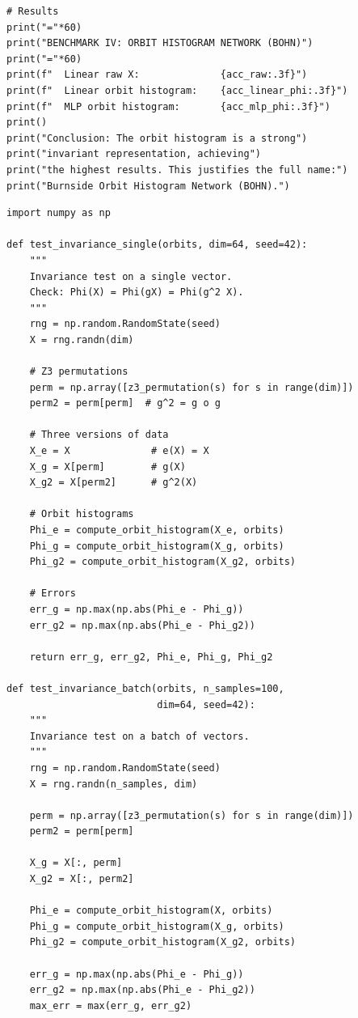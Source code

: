 \documentclass[11pt,a4paper]{report}
\begin{document}
\begin{lstlisting}[caption={Benchmark IV --- Orbit Histogram Network (BOHN)}]
# Results
print("="*60)
print("BENCHMARK IV: ORBIT HISTOGRAM NETWORK (BOHN)")
print("="*60)
print(f"  Linear raw X:              {acc_raw:.3f}")
print(f"  Linear orbit histogram:    {acc_linear_phi:.3f}")
print(f"  MLP orbit histogram:       {acc_mlp_phi:.3f}")
print()
print("Conclusion: The orbit histogram is a strong")
print("invariant representation, achieving")
print("the highest results. This justifies the full name:")
print("Burnside Orbit Histogram Network (BOHN).")
\end{lstlisting}

\label{app:ch2-lst9}
\begin{lstlisting}[caption={Orbit histogram invariance test}]
import numpy as np

def test_invariance_single(orbits, dim=64, seed=42):
    """
    Invariance test on a single vector.
    Check: Phi(X) = Phi(gX) = Phi(g^2 X).
    """
    rng = np.random.RandomState(seed)
    X = rng.randn(dim)
    
    # Z3 permutations
    perm = np.array([z3_permutation(s) for s in range(dim)])
    perm2 = perm[perm]  # g^2 = g o g
    
    # Three versions of data
    X_e = X              # e(X) = X
    X_g = X[perm]        # g(X)
    X_g2 = X[perm2]      # g^2(X)
    
    # Orbit histograms
    Phi_e = compute_orbit_histogram(X_e, orbits)
    Phi_g = compute_orbit_histogram(X_g, orbits)
    Phi_g2 = compute_orbit_histogram(X_g2, orbits)
    
    # Errors
    err_g = np.max(np.abs(Phi_e - Phi_g))
    err_g2 = np.max(np.abs(Phi_e - Phi_g2))
    
    return err_g, err_g2, Phi_e, Phi_g, Phi_g2

def test_invariance_batch(orbits, n_samples=100, 
                          dim=64, seed=42):
    """
    Invariance test on a batch of vectors.
    """
    rng = np.random.RandomState(seed)
    X = rng.randn(n_samples, dim)
    
    perm = np.array([z3_permutation(s) for s in range(dim)])
    perm2 = perm[perm]
    
    X_g = X[:, perm]
    X_g2 = X[:, perm2]
    
    Phi_e = compute_orbit_histogram(X, orbits)
    Phi_g = compute_orbit_histogram(X_g, orbits)
    Phi_g2 = compute_orbit_histogram(X_g2, orbits)
    
    err_g = np.max(np.abs(Phi_e - Phi_g))
    err_g2 = np.max(np.abs(Phi_e - Phi_g2))
    max_err = max(err_g, err_g2)
    

\end{lstlisting}
\end{document}
